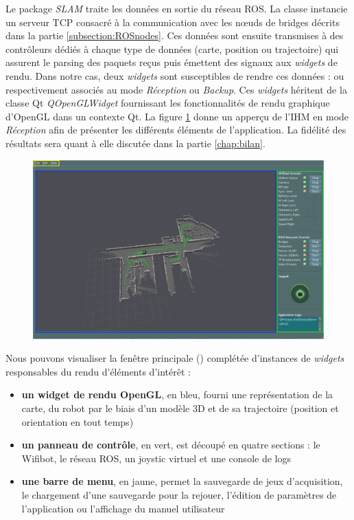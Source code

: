 Le package \emph{SLAM} traite les données en sortie du réseau \gls{ROS}. 
La classe  instancie un serveur \gls{TCP} consacré à la communication avec les n\oe{}uds de bridges décrits dans la partie \ref{subsection:ROSnodes}. 
Ces données sont ensuite transmises à des contrôleurs dédiés à chaque type de données (carte, position ou trajectoire) qui assurent le parsing des paquets reçus puis émettent des signaux aux \emph{widgets} de rendu. 
Dans notre cas, deux \emph{widgets} sont susceptibles de rendre ces données :  ou  respectivement associés au mode \emph{Réception} ou \emph{Backup}.
Ces \emph{widgets} héritent de la classe Qt \emph{QOpenGLWidget} fournissant les fonctionnalités de rendu graphique d'OpenGL dans un contexte Qt. 
La figure \ref{fig:reception} donne un apperçu de l'\gls{IHM} en mode \emph{Réception} afin de présenter les différents éléments de l'application. 
La fidélité des résultats sera quant à elle discutée dans la partie \ref{chap:bilan}.  

\begin{figure}[h]
  \centering
    \includegraphics[width=1.\linewidth]{figures/slam-widget}  
  \label{fig:reception}
\end{figure}

Nous pouvons visualiser la fenêtre principale () complétée d'instances de \emph{widgets} responsables du rendu d'éléments d'intérêt : 
\begin{itemize}
 \item \textbf{un widget de rendu OpenGL}, en bleu, fourni une représentation de la carte, du robot par le biais d'un modèle 3D et de sa trajectoire (position et orientation en tout temps)
 \item \textbf{un panneau de contrôle}, en vert, est découpé en quatre sections : le Wifibot, le réseau ROS, un joystic virtuel et une console de logs 
 \item \textbf{une barre de menu}, en jaune, permet la sauvegarde de jeux d'acquisition, le chargement d'une sauvegarde pour la rejouer, l'édition de paramètres de l'application ou l'affichage du manuel utilisateur
\end{itemize}


